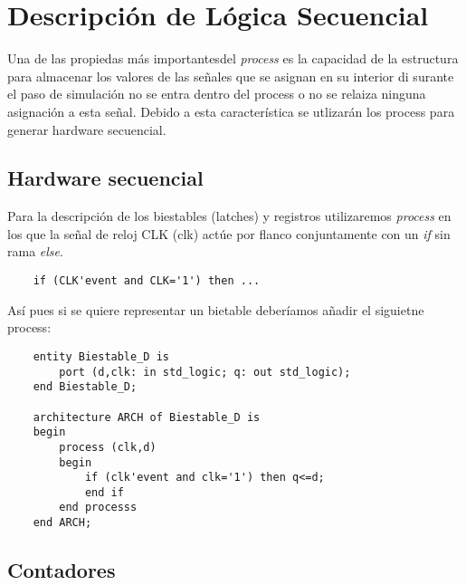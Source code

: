 \section{Descripción de Lógica Secuencial}

Una de las propiedas más importantesdel \textit{process} es la capacidad de la estructura para almacenar los valores de las señales que se asignan en su interior di surante el paso de simulación no se entra dentro del process o no se relaiza ninguna asignación a esta señal. Debido a esta característica se utlizarán los process para generar hardware secuencial. 

\subsection{Hardware secuencial}

Para la descripción de los biestables (latches) y registros utilizaremos \textit{process} en los que la señal de reloj CLK (clk) actúe por flanco conjuntamente con un \textit{if} sin rama \textit{else}.

\begin{lstlisting}
    if (CLK'event and CLK='1') then ...
\end{lstlisting}
Así pues si se quiere representar un bietable deberíamos añadir el siguietne process: 

\begin{lstlisting}
    entity Biestable_D is 
        port (d,clk: in std_logic; q: out std_logic);
    end Biestable_D;

    architecture ARCH of Biestable_D is
    begin
        process (clk,d)
        begin
            if (clk'event and clk='1') then q<=d;
            end if
        end processs
    end ARCH;
\end{lstlisting}

\subsection{Contadores}
